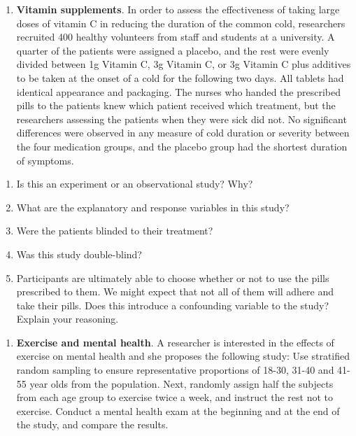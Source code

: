 \documentclass[
  letterpaper,
  DIV=11,
  numbers=noendperiod]{scrreprt}
\providecommand{\tightlist}{%
  \setlength{\itemsep}{0pt}\setlength{\parskip}{0pt}}\usepackage{longtable,booktabs,array}
\begin{document}
\begin{enumerate}
\def\labelenumi{\arabic{enumi}.}
\setcounter{enumi}{3}
\tightlist
\item
  \textbf{Vitamin supplements}. In order to assess the effectiveness of
  taking large doses of vitamin C in reducing the duration of the common
  cold, researchers recruited 400 healthy volunteers from staff and
  students at a university. A quarter of the patients were assigned a
  placebo, and the rest were evenly divided between 1g Vitamin C, 3g
  Vitamin C, or 3g Vitamin C plus additives to be taken at the onset of
  a cold for the following two days. All tablets had identical
  appearance and packaging. The nurses who handed the prescribed pills
  to the patients knew which patient received which treatment, but the
  researchers assessing the patients when they were sick did not. No
  significant differences were observed in any measure of cold duration
  or severity between the four medication groups, and the placebo group
  had the shortest duration of symptoms.
\end{enumerate}

\begin{enumerate}
\def\labelenumi{\alph{enumi}.}
\item
  Is this an experiment or an observational study? Why?
\item
  What are the explanatory and response variables in this study?
\item
  Were the patients blinded to their treatment?
\item
  Was this study double-blind?
\item
  Participants are ultimately able to choose whether or not to use the
  pills prescribed to them. We might expect that not all of them will
  adhere and take their pills. Does this introduce a confounding
  variable to the study? Explain your reasoning.
\end{enumerate}

\begin{enumerate}
\def\labelenumi{\arabic{enumi}.}
\setcounter{enumi}{4}
\tightlist
\item
  \textbf{Exercise and mental health}. A researcher is interested in the
  effects of exercise on mental health and she proposes the following
  study: Use stratified random sampling to ensure representative
  proportions of 18-30, 31-40 and 41-55 year olds from the population.
  Next, randomly assign half the subjects from each age group to
  exercise twice a week, and instruct the rest not to exercise. Conduct
  a mental health exam at the beginning and at the end of the study, and
  compare the results.
\end{enumerate}
\end{document}
